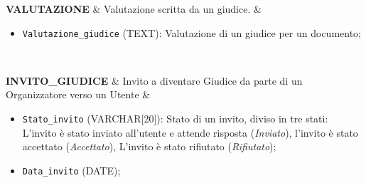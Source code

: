 \documentclass[a4paper, 11pt]{article}
\begin{document}
{\begin{longtable}
			\textbf{VALUTAZIONE} &
			Valutazione scritta da un giudice. &
			\begin{itemize}
				\item \texttt{Valutazione\_giudice} (TEXT): Valutazione di un giudice per un documento;
			\end{itemize} \\
			\hline
			
			\textbf{INVITO\_GIUDICE} &
			Invito a diventare Giudice da parte di un Organizzatore verso un Utente &
			\begin{itemize}
				\item \texttt{Stato\_invito} (VARCHAR[20]): Stato di un invito, diviso in tre stati: L'invito è stato inviato all'utente e attende risposta (\textit{Inviato}), l'invito è stato accettato (\textit{Accettato}), L'invito è stato rifiutato (\textit{Rifiutato});
				\item \texttt{Data\_invito} (DATE);
			\end{itemize} \\ 
		\end{longtable}
	}
\end{document}
